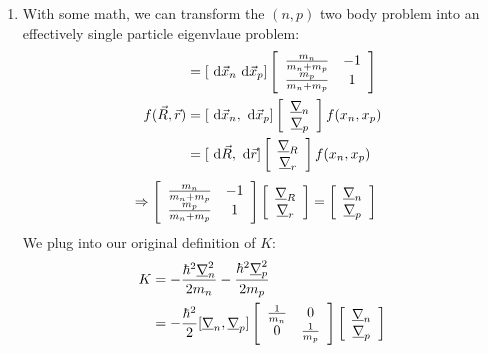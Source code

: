 \documentclass{school-22.101-notes}
\begin{document}
\begin{enumerate}
\item With some math, we can transform the $(n,p)$ two body problem into an effectively single particle eigenvlaue problem: 
\begin{align}
[\derivative \vec{R}, \derivative \vec{r}] &= [ \derivative \vec{x}_n \derivative \vec{x}_p] \left[ \begin{array}{cc} 
\frac{m_n}{m_n + m_p} & -1 \\ 
\frac{m_p}{m_n + m_p} & 1 
\end{array} \right]   \\
f(\vec{R}, \vec{r}) &= [ \derivative \vec{x}_n, \derivative \vec{x}_p]  \left[ \begin{array}{c} \uline{\gradient}_n \\ \uline{\gradient}_p \end{array} \right] f(x_n, x_p)  \\
&= [ \derivative \vec{R}, \derivative \vec{r}]  \left[ \begin{array}{c} \uline{\gradient}_R \\ \uline{\gradient}_r \end{array} \right] f(x_n, x_p)  
\end{align}
\begin{align}
\Rightarrow 
\left[ \begin{array}{cc} 
\frac{m_n}{m_n + m_p} & -1 \\ 
\frac{m_p}{m_n + m_p} & 1 
\end{array} \right]   
\left[ \begin{array}{c} \underline{\nabla}_R \\ \underline{\nabla}_r \end{array} \right] 
&=  \left[ \begin{array}{c} \underline{\nabla}_n \\ \underline{\nabla}_p \end{array} \right]
\end{align}
We plug into our original definition of $K$: 
\begin{align}
K &= - \frac{\hbar^2 \uline{\gradient}_n^2}{2 m_n}  - \frac{\hbar^2 \uline{\gradient}_p^2}{2 m_p}  \\
&= - \frac{\hbar^2}{2} [ \uline{\gradient}_n, \uline{\gradient}_p] \left[ \begin{array}{cc} \frac{1}{m_n} & 0 \\ 0 & \frac{1}{m_p} \end{array} \right] \left[ \begin{array}{c} \uline{\gradient}_n \\ \uline{\gradient}_p \end{array} \right] \\

\end{align}
\end{enumerate}
\end{document}
